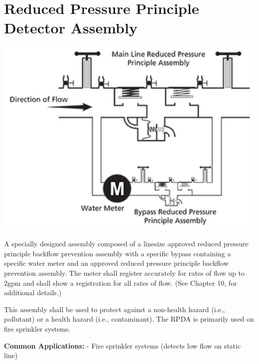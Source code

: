 \documentclass[10pt]{article}
\begin{document}
\section{Reduced Pressure Principle Detector Assembly}
\includegraphics[max width=\textwidth]{ReducedPressurePrincipleDetector}

A specially designed assembly composed of a linesize approved reduced pressure principle backflow prevention assembly with a specific bypass containing a specific water meter and an approved reduced pressure principle backflow prevention assembly. The meter shall register accurately for rates of flow up to $2 \mathrm{gpm}$ and shall show a registration for all rates of flow. (See Chapter 10, for additional details.)

This assembly shall be used to protect against a non-health hazard (i.e., pollutant) or a health hazard (i.e., contaminant). The RPDA is primarily used on fire sprinkler systems.

\textbf{Common Applications: } - Fire sprinkler systems (detects low flow on static line)
\end{document}
